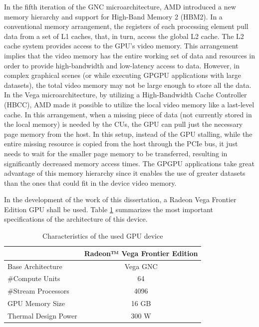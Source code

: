 In the fifth iteration of the GNC microarchitecture, AMD introduced a new memory hierarchy and support for High-Band Memory 2 (HBM2). In a conventional memory arrangement, the registers of each processing element pull data from a set of L1 caches, that, in turn, access the global L2 cache. The L2 cache system provides access to the GPU's video memory. This arrangement implies that the video memory has the entire working set of data and resources in order to provide high-bandwidth and low-latency access to data. However, in complex graphical scenes (or while executing GPGPU applications with large datasets), the total video memory may not be large enough to store all the data. In the Vega microarchitecture, by utilizing a  High-Bandwidth Cache Controller (HBCC), AMD made it possible to utilize the local video memory like a last-level cache. In this arrangement, when a missing piece of data (not currently stored in the local memory) is needed by the CUs, the GPU can pull just the necessary page memory from the host. In this setup, instead of the GPU stalling, while the entire missing resource is copied from the host through the PCIe bus, it just needs to wait for the smaller page memory to be transferred, resulting in significantly decreased memory access times. The GPGPU applications take great advantage of this memory hierarchy since it enables the use of greater datasets than the ones that could fit in the device video memory.

In the development of the work of this dissertation, a Radeon Vega Frontier Edition GPU shall be used. Table \ref{tab:gpusepcs} summarizes the most important specifications of the architecture of this device.

\begin{table}[!htb]
    \renewcommand{\arraystretch}{1.2} %
    \centering
        \begin{tabular}{lc}
            \multicolumn{1}{c}{\textbf{}} & \multicolumn{1}{l}{\textbf{Radeon™ Vega Frontier Edition}} \\ \hline
            Base Architecture             & Vega GNC                                                   \\
            \#Compute Units               & 64                                                         \\
            \#Stream Processors           & 4096                                                       \\
            GPU Memory Size               & 16 GB                                                      \\
            Thermal Design Power          & 300 W                                                      \\ \hline
        \end{tabular}
    \caption{Characteristics of the used GPU device}
    \label{tab:gpusepcs}
\end{table}

